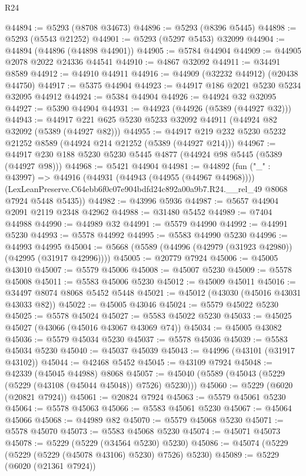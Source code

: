 \begin{lexlean}{R24}
\begin{coremodule}
@44894 := @5293 (@8708 @34673)
@44896 := @5293 (@8396 @5445)
@44898 := @5293 (@5543 @21252)
@44901 := @5293 (@5297 @5453) @32099
@44904 := @44894 (@44896 (@44898 @44901))
@44905 := @5784 @44904
@44909 := @44905 @2078 @2022 @24336 @44541
@44910 := @4867 @32092
@44911 := @34491 @8589
@44912 := @44910 @44911
@44916 := @44909 (@32232 @44912) (@20438 @44750)
@44917 := @5375 @44904
@44923 := @44917 @186 @2021 @5230 @5234 @32095 @44912
@44924 := @5384 @44904
@44926 := @44924 @32 @32095
@44927 := @5390 @44904
@44931 := @44923 (@44926 (@5389 (@44927 @32)))
@44943 := @44917 @221 @625 @5230 @5233 @32092 @44911 (@44924 @82 @32092 (@5389 (@44927 @82)))
@44955 := @44917 @219 @232 @5230 @5232 @21252 @8589 (@44924 @214 @21252 (@5389 (@44927 @214)))
@44967 := @44917 @230 @188 @5230 @5230 @5445 @4877 (@44924 @98 @5445 (@5389 (@44927 @98)))
@44968 := @5421 @44904
@44981 := @44892
    (fun ("_" : @43997) =>
    @44916
      (@44931 (@44943 (@44955 (@44967 @44968))))
      (LexLeanPreserve.C64ebb6f0c07e904bdfd24c892a00a9b7.R24.__rel_49 @8068 @7924 @5448 @5435))
@44982 := @43996 @5936
@44987 := @5657 @44904 @2091 @2119 @2348 @42962
@44988 := @31480 @5452
@44989 := @7404 @44988
@44990 := @44989 @32
@44991 := @5579 @44990
@44992 := @44991 @5230
@44993 := @5578 @44992
@44995 := @5583 @44990 @5230
@44996 := @44993 @44995
@45004 := @5668 (@5589 (@44996 (@42979 (@31923 @42980)) (@42995 (@31917 @42996))))
@45005 := @20779 @7924
@45006 := @45005 @43010
@45007 := @5579 @45006
@45008 := @45007 @5230
@45009 := @5578 @45008
@45011 := @5583 @45006 @5230
@45012 := @45009 @45011
@45016 := @34497 @8074 @8068 @5452 @5448
@45021 := @45012 (@43030 (@45016 @43031 @43033 @82))
@45022 := @45005 @43046
@45024 := @5579 @45022 @5230
@45025 := @5578 @45024
@45027 := @5583 @45022 @5230
@45033 := @45025 @45027 (@43066 (@45016 @43067 @43069 @74))
@45034 := @45005 @43082
@45036 := @5579 @45034 @5230
@45037 := @5578 @45036
@45039 := @5583 @45034 @5230
@45040 := @45037 @45039
@45043 := @44996 (@43101 (@31917 @43102))
@45044 := @42468 @5452
@45045 := @43109 @7924
@45048 := @42339 (@45045 @44988) @8068
@45057 := @45040 (@5589 (@45043 (@5229 (@5229 (@43108 (@45044 @45048)) @7526) @5230)))
@45060 := @5229 (@6020 (@20821 @7924))
@45061 := @20824 @7924
@45063 := @5579 @45061 @5230
@45064 := @5578 @45063
@45066 := @5583 @45061 @5230
@45067 := @45064 @45066
@45068 := @44989 @82
@45070 := @5579 @45068 @5230
@45071 := @5578 @45070
@45073 := @5583 @45068 @5230
@45074 := @45071 @45073
@45078 := @5229 (@5229 (@34564 @5230) @5230)
@45086 := @45074 (@5229 (@5229 (@5229 (@45078 @43106) @5230) @7526) @5230)
@45089 := @5229 (@6020 (@21361 @7924))

\end{coremodule}
\end{lexlean}
